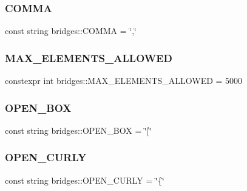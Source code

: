 \hypertarget{namespacebridges_a74087afbaa635d3c3d837cc3b44c0162}{}\label{namespacebridges_a74087afbaa635d3c3d837cc3b44c0162} 
\subsubsection{\texorpdfstring{C\+O\+M\+MA}{COMMA}}
{\footnotesize\ttfamily const string bridges\+::\+C\+O\+M\+MA = \char`\"{},\char`\"{}}

\hypertarget{namespacebridges_adc32aeee3ab880d297758a6d6200188f}{}\label{namespacebridges_adc32aeee3ab880d297758a6d6200188f} 
\subsubsection{\texorpdfstring{M\+A\+X\+\_\+\+E\+L\+E\+M\+E\+N\+T\+S\+\_\+\+A\+L\+L\+O\+W\+ED}{MAX\_ELEMENTS\_ALLOWED}}
{\footnotesize\ttfamily constexpr int bridges\+::\+M\+A\+X\+\_\+\+E\+L\+E\+M\+E\+N\+T\+S\+\_\+\+A\+L\+L\+O\+W\+ED = 5000}

\hypertarget{namespacebridges_a6b481335016325fe202a4e2fedd0af14}{}\label{namespacebridges_a6b481335016325fe202a4e2fedd0af14} 
\subsubsection{\texorpdfstring{O\+P\+E\+N\+\_\+\+B\+OX}{OPEN\_BOX}}
{\footnotesize\ttfamily const string bridges\+::\+O\+P\+E\+N\+\_\+\+B\+OX = \char`\"{}\mbox{[}\char`\"{}}

\hypertarget{namespacebridges_a9bef552535e3f5bbfc2ca586cb5044c6}{}\label{namespacebridges_a9bef552535e3f5bbfc2ca586cb5044c6} 
\subsubsection{\texorpdfstring{O\+P\+E\+N\+\_\+\+C\+U\+R\+LY}{OPEN\_CURLY}}
{\footnotesize\ttfamily const string bridges\+::\+O\+P\+E\+N\+\_\+\+C\+U\+R\+LY = \char`\"{}\{\char`\"{}}

